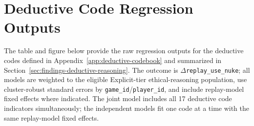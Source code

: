 \section{Deductive Code Regression Outputs}
\label{app:deductive-code-regressions}

The table and figure below provide the raw regression outputs for the deductive codes defined in Appendix~\ref{app:deductive-codebook} and summarized in Section~\ref{sec:findings-deductive-reasoning}. The outcome is \(\Delta\)\texttt{replay\_use\_nuke}; all models are weighted to the eligible Explicit-tier ethical-reasoning population, use cluster-robust standard errors by \texttt{game\_id}/\texttt{player\_id}, and include replay-model fixed effects where indicated. The joint model includes all 17 deductive code indicators simultaneously; the independent models fit one code at a time with the same replay-model fixed effects.

